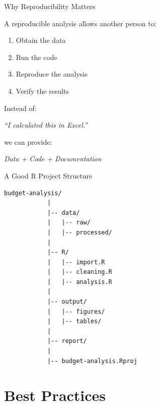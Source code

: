 \documentclass[aspectratio=169,11pt]{beamer}
\begin{document}
	\begin{frame}{Why Reproducibility Matters}
		
		A reproducible analysis allows another person to:
		
		\begin{enumerate}
			\item Obtain the data
			\item Run the code
			\item Reproduce the analysis
			\item Verify the results
		\end{enumerate}
		
		\vspace{0.4cm}
		
		Instead of:
		
		\begin{center}
			\textit{``I calculated this in Excel.''}
		\end{center}
		
		we can provide:
		
		\begin{center}
			\textit{Data + Code + Documentation}
		\end{center}
		
	\end{frame}
	
	
	\begin{frame}[fragile]{A Good R Project Structure}
		
		\begin{lstlisting}[basicstyle=\footnotesize\ttfamily]
			budget-analysis/
			|
			|-- data/
			|   |-- raw/
			|   |-- processed/
			|
			|-- R/
			|   |-- import.R
			|   |-- cleaning.R
			|   |-- analysis.R
			|
			|-- output/
			|   |-- figures/
			|   |-- tables/
			|
			|-- report/
			|
			|-- budget-analysis.Rproj
		\end{lstlisting}
		
	\end{frame}
	
	

	
	
	\section{Best Practices}
	
\end{document}
